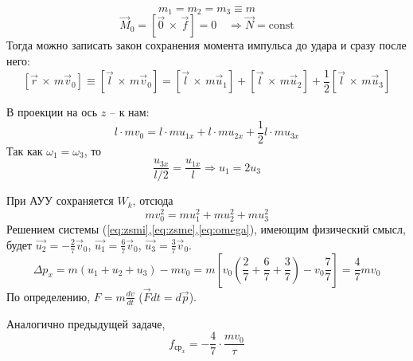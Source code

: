 \documentclass[a5paper,10pt]{article}
\begin{document}
\begin{equation*}
    m_1=m_2=m_3\equiv m
\end{equation*}
\begin{equation}
    \vec{M}_0=[\vec{0}\,\times\,\vec{f}]=0 \quad \Longrightarrow \vec{N}=\text{const}
\end{equation}
Тогда можно записать закон сохранения момента импульса до удара и сразу после него:
\begin{equation}
    \label{eq1}
    [\vec{r}\,\times\,{m\vec{v}_0}]
    \equiv [\vec{l}\,\times\,{m\vec{v}_0}]=
    [\vec{l}\,\times\,{m\vec{u}_1}]+
    [\vec{l}\,\times\,{m\vec{u}_2}]+
    \frac{1}{2}[\vec{l}\,\times\,{m\vec{u}_3}]
\end{equation}

В проекции на ось $z$ -- к нам:
\begin{equation}
    \label{eq:zsmi}
    l\cdot mv_0 = 
                l\cdot mu_{1x}+
                l\cdot mu_{2x}+
                \frac{1}{2}l\cdot mu_{3x}
\end{equation}
Так как $\omega_1=\omega_3$, то 
\begin{equation}
    \label{eq:omega}
    \frac{u_{3x}}{l/2}=\frac{u_{1x}}{l}
    \Longrightarrow
    u_1=2u_3
\end{equation}

При АУУ сохраняется $W_k$, отсюда
\begin{equation}
    \label{eq:zsme}
    mv_0^2=mu_1^2+
           mu_2^2+
           mu_3^2
\end{equation}
Решением системы (\ref{eq:zsmi},\ref{eq:zsme},\ref{eq:omega}), имеющим физический смысл, будет $\vec{u_{2}}=-\frac{2}{7}\vec{v}_0$, $\vec{u_{1}}=\frac{6}{7}\vec{v}_0$, $\vec{u_{3}}=\frac{3}{7}\vec{v}_0$.
\begin{equation}
    \Delta p_x=m(u_1+u_2+u_3)-mv_0=m[v_0(\frac{2}{7}+\frac{6}{7}+\frac{3}{7})-v_0\frac{7}{7}]=\frac{4}{7}mv_0
\end{equation}
По определению, $ F=m\frac{dv}{dt}$ ($\vec{F}dt=d\vec{p}$).

Аналогично предыдущей задаче,
\begin{equation}
    f_{\text{ср}_x}=-\frac{4}{7}\cdot\frac{mv_0}{\tau}
\end{equation}
\end{document}
